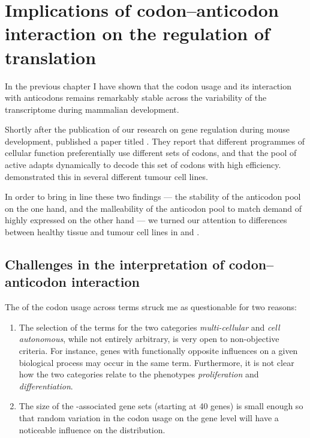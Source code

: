 \chapter{Implications of codon–anticodon interaction on the regulation of translation}

In the previous chapter I have shown that the codon usage and its interaction
with \trna anticodons remains remarkably stable across the variability of the
transcriptome during mammalian development.

Shortly after the publication of our research on \trna gene regulation during
mouse development, \citet{Gingold:2014} published a paper titled . They report that different programmes of cellular function
preferentially use different sets of codons, and that the pool of active
\trna[s] adapts dynamically to decode this set of codons with high efficiency.
\citet{Gingold:2014} demonstrated this in several different tumour cell lines.

In order to bring in line these two findings — the stability of the anticodon
pool on the one hand, and the malleability of the anticodon pool to match demand
of highly expressed on the other hand — we turned our attention to differences
between healthy tissue and tumour cell lines in \mmu and \hsa.


\section{Challenges in the interpretation of codon–anticodon interaction}

The \pca of the codon usage across \go terms struck me as questionable for two
reasons:

\begin{enumerate}
    \item The selection of the \go terms for the two categories
        \emph{multi-cellular} and \emph{cell autonomous}, while not entirely
        arbitrary, is very open to non-objective criteria. For instance, genes
        with functionally opposite influences on a given biological process may
        occur in the same \go term. Furthermore, it is not clear how the two
        categories relate to the phenotypes \emph{proliferation} and
        \emph{differentiation}.
    \item The size of the \go-associated gene sets (starting at \num{40} genes)
        is small enough so that random variation in the codon usage on the gene
        level will have a noticeable influence on the distribution.
\end{enumerate}

